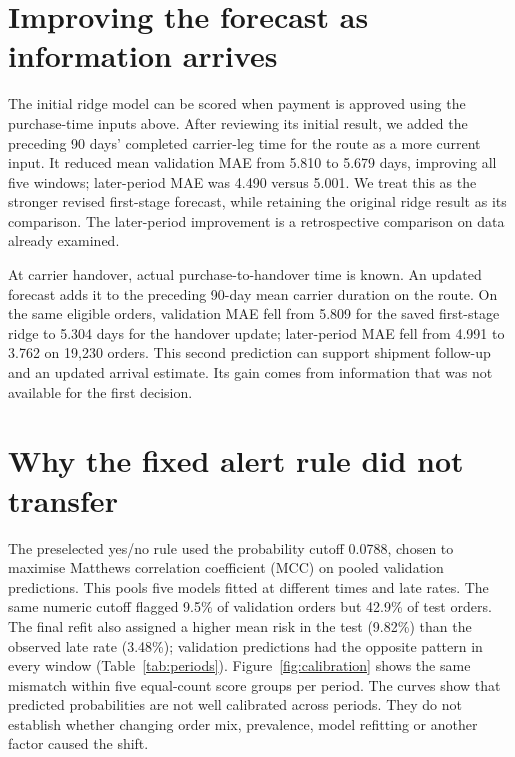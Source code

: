 \documentclass[12pt,a4paper]{article}
\begin{document}
\section*{Improving the forecast as information arrives}
The initial ridge model can be scored when payment is approved using the purchase-time inputs above. After reviewing its initial result, we added the preceding 90 days' completed carrier-leg time for the route as a more current input. It reduced mean validation MAE from 5.810 to 5.679 days, improving all five windows; later-period MAE was 4.490 versus 5.001. We treat this as the stronger revised first-stage forecast, while retaining the original ridge result as its comparison. The later-period improvement is a retrospective comparison on data already examined.

At carrier handover, actual purchase-to-handover time is known. An updated forecast adds it to the preceding 90-day mean carrier duration on the route. On the same eligible orders, validation MAE fell from 5.809 for the saved first-stage ridge to 5.304 days for the handover update; later-period MAE fell from 4.991 to 3.762 on 19,230 orders. This second prediction can support shipment follow-up and an updated arrival estimate. Its gain comes from information that was not available for the first decision.

\section*{Why the fixed alert rule did not transfer}
The preselected yes/no rule used the probability cutoff 0.0788, chosen to maximise Matthews correlation coefficient (MCC) on pooled validation predictions. This pools five models fitted at different times and late rates. The same numeric cutoff flagged 9.5\% of validation orders but 42.9\% of test orders. The final refit also assigned a higher mean risk in the test (9.82\%) than the observed late rate (3.48\%); validation predictions had the opposite pattern in every window (Table~\ref{tab:periods}). Figure~\ref{fig:calibration} shows the same mismatch within five equal-count score groups per period. The curves show that predicted probabilities are not well calibrated across periods. They do not establish whether changing order mix, prevalence, model refitting or another factor caused the shift.
\end{document}
